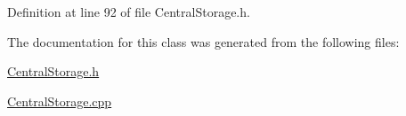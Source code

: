 \-Definition at line 92 of file \-Central\-Storage.\-h.



\-The documentation for this class was generated from the following files\-:\begin{DoxyCompactItemize}
\item 
\hyperlink{CentralStorage_8h}{\-Central\-Storage.\-h}\item 
\hyperlink{CentralStorage_8cpp}{\-Central\-Storage.\-cpp}\end{DoxyCompactItemize}
